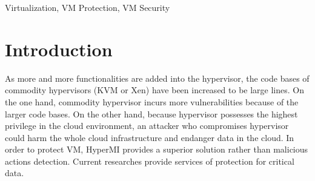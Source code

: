 \documentclass[conference]{IEEEtran}
\begin{document}
\begin{IEEEkeywords}
Virtualization, VM Protection, VM Security
\end{IEEEkeywords}

\section{Introduction}

As more and more functionalities are added into the hypervisor, the code bases of commodity hypervisors (KVM or Xen) have been increased to be large lines. On the one hand, commodity hypervisor incurs more vulnerabilities because of the larger code bases. On the other hand, because hypervisor possesses the highest privilege in the cloud environment, an attacker who compromises hypervisor could harm the whole cloud infrastructure and endanger data in the cloud.
In order to protect VM, HyperMI provides a superior solution rather than malicious actions detection.
Current researches provide services of protection for critical data.
\end{document}
